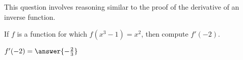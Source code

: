 \documentclass{ximera}
\author{Steven Gubkin}
\begin{document}
\begin{exercise}



This question involves reasoning similar to the proof of the derivative of an inverse function.

If $f$ is a function for which $f(x^3-1) = x^2$, then compute $f'(-2)$.

$f'(-2) = \answer{-\frac{2}{3}}$

\end{exercise}
\end{document}
